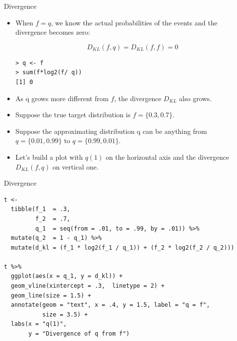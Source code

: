 \documentclass[handout]{beamer}
\begin{document}
\begin{frame}[fragile]{Divergence}
\scriptsize{

\begin{itemize}

\item  When $f = q$, we know the actual probabilities of the events and the divergence becomes zero: 

 \begin{displaymath}
                     D_{KL}(f,q) =   D_{KL}(f,f) = 0
                    \end{displaymath}


\begin{verbatim}
> q <- f
> sum(f*log2(f/ q)) 
[1] 0
\end{verbatim}
                    
\item As q grows more different from $f$, the divergence $D_{KL}$ also grows.       
       
\item Suppose the true target distribution is $f = \{0.3, 0.7\}$.

\item Suppose the approximating distribution q can be anything from $q = \{0.01, 0.99\}$ to $q = \{0.99, 0.01\}$.       
       
\item Let's build a plot with $q(1)$ on the horizontal axis and the divergence $D_{KL}(f, q)$ on vertical one.       
       
\end{itemize}


} 
\end{frame}

\begin{frame}[fragile]{Divergence}
\scriptsize{

\begin{verbatim}
t <- 
  tibble(f_1  = .3,
         f_2  = .7,
         q_1  = seq(from = .01, to = .99, by = .01)) %>% 
  mutate(q_2  = 1 - q_1) %>%
  mutate(d_kl = (f_1 * log2(f_1 / q_1)) + (f_2 * log2(f_2 / q_2)))

t %>% 
  ggplot(aes(x = q_1, y = d_kl)) +
  geom_vline(xintercept = .3,  linetype = 2) +
  geom_line(size = 1.5) +
  annotate(geom = "text", x = .4, y = 1.5, label = "q = f", 
           size = 3.5) +
  labs(x = "q(1)",
       y = "Divergence of q from f") 
\end{verbatim}



} 
\end{frame}
\end{document}
